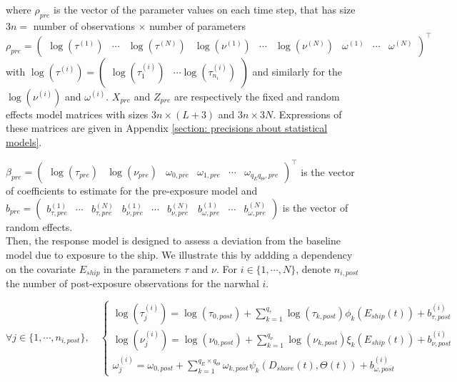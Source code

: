 \documentclass[11pt]{article}
\newcommand {\1}{\mathbb{1}}
\begin{document}
where $\rho_{pre}$ is the vector of the parameter values on each time step, that has size $3n=$ number of observations $\times$ number of parameters  \[\rho_{pre}=\begin{pmatrix}
\log(\tau^{(1)}) & \cdots & \log(\tau^{(N)}) & \log(\nu^{(1)}) &
\cdots & \log(\nu^{(N)}) & \omega^{(1)}  &\cdots & \omega^{(N)}
\end{pmatrix}^\top\]
with $	\log(\tau^{(i)})=\begin{pmatrix} \log(\tau^{(i)}_1) & \cdots \log(\tau^{(i)}_{n_i})\end{pmatrix}$ and similarly for the $\log(\nu^{(i)})$ and $\omega^{(i)}$.
$X_{pre}$ and $Z_{pre}$ are respectively the fixed and random effects model matrices with sizes $3n \times (L+3)$ and $3n \times 3N$. Expressions of these matrices are given in Appendix \ref{section: precisions about statistical models}.

$\beta_{pre}=\begin{pmatrix}
	\log(\tau_{pre}) &
	\log(\nu_{pre})  &
	\omega_{0,pre} &
	\omega_{1,pre} &
	\cdots & 
	\omega_{q_E q_{\Theta},pre}
\end{pmatrix}^\top$ is the vector of coefficients to estimate for the pre-exposure model and $b_{pre}=\begin{pmatrix}  b_{\tau,pre}^{(1)} &\cdots& b_{\tau,pre}^{(N)} &b_{\nu,pre}^{(1)}& \cdots & b_{\nu,pre}^{(N)} & b_{\omega,pre}^{(1)} & \cdots & b_{\omega,pre}^{(N)} \end{pmatrix}$ is the vector of random effects.\\

Then, the response model is designed to assess a deviation from the baseline model due to exposure to the ship. We illustrate this by addding a dependency on the covariate $E_{ship}$ in the parameters $\tau$ and $\nu$. 
For $i \in \{1, \cdots, N\}$, denote $n_{i,post}$ the number of post-exposure observations for the narwhal $i$.

\begin{equation} 
	\forall j \in \{1,\cdots, n_{i,post}\}, \quad 
	\left\{\begin{array}{l}
		
		\log(\tau^{(i)}_j)=\log(\tau_{0,post}) +\sum_{k=1}^{q_{\tau}} \log(\tau_{k,post})\phi_{k}(E_{ship}(t))+b^{(i)}_{\tau,post} \\
		\log(\nu^{(i)}_j)=\log(\nu_{0,post}) +  \sum_{k=1}^{q_{\nu}} \log(\nu_{k,post}) \xi_{k}(E_{ship}(t)) +b^{(i)}_{\nu,post}  \\
		\omega^{(i)}_j=\omega_{0,post}+\sum_{k=1}^{q_E\times q_{\Theta}} \omega_{k,post} \psi_k(D_{shore}(t),\Theta(t)) + b_{\omega,post}^{(i)}
	\end{array}
	\right.
	\label{eq: response model}
\end{equation}
\end{document}
